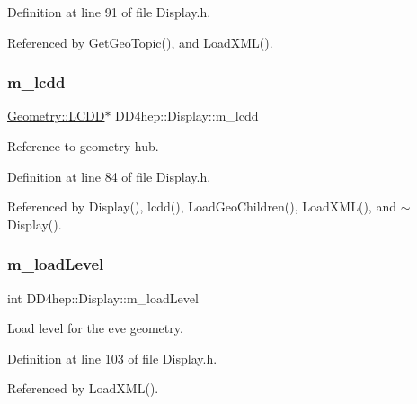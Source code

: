 Definition at line 91 of file Display.\+h.



Referenced by Get\+Geo\+Topic(), and Load\+X\+M\+L().

\hypertarget{class_d_d4hep_1_1_display_a829bb86fd3460a74ca1da6c51e2802ef}{}\label{class_d_d4hep_1_1_display_a829bb86fd3460a74ca1da6c51e2802ef} 
\subsubsection{\texorpdfstring{m\+\_\+lcdd}{m\_lcdd}}
{\footnotesize\ttfamily \hyperlink{class_d_d4hep_1_1_geometry_1_1_l_c_d_d}{Geometry\+::\+L\+C\+DD}$\ast$ D\+D4hep\+::\+Display\+::m\+\_\+lcdd\hspace{0.3cm}{\ttfamily [protected]}}



Reference to geometry hub. 



Definition at line 84 of file Display.\+h.



Referenced by Display(), lcdd(), Load\+Geo\+Children(), Load\+X\+M\+L(), and $\sim$\+Display().

\hypertarget{class_d_d4hep_1_1_display_a82e390dcf9124ff53abd433e9b0bcef5}{}\label{class_d_d4hep_1_1_display_a82e390dcf9124ff53abd433e9b0bcef5} 
\subsubsection{\texorpdfstring{m\+\_\+load\+Level}{m\_loadLevel}}
{\footnotesize\ttfamily int D\+D4hep\+::\+Display\+::m\+\_\+load\+Level\hspace{0.3cm}{\ttfamily [protected]}}



Load level for the eve geometry. 



Definition at line 103 of file Display.\+h.



Referenced by Load\+X\+M\+L().

\hypertarget{class_d_d4hep_1_1_display_aa6b6e111d83802be4a9a39024cfda066}{}\label{class_d_d4hep_1_1_display_aa6b6e111d83802be4a9a39024cfda066} 
